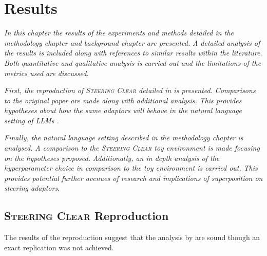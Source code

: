 \chapter{Results}
\label{ch:results}

\emph{In this chapter the results of the experiments and methods detailed in the methodology chapter  and background chapter  are presented.}
\emph{A detailed analysis of the results is included along with references to similar results within the literature.}
\emph{Both quantitative and qualitative analysis is carried out and the limitations of the metrics used are discussed.}

\emph{First, the reproduction of {\scshape Steering Clear} \citep{steering-clear} detailed in  is presented.}
\emph{Comparisons to the original paper are made along with additional analysis.}
\emph{This provides hypotheses about how the same adaptors will behave in the natural language setting of LLMs .}

\emph{Finally, the natural language setting described in the methodology chapter  is analysed.}
\emph{A comparison to the {\scshape Steering Clear} toy environment is made focusing on the hypotheses proposed.}
\emph{Additionally, an in depth analysis of the hyperparameter choice in comparison to the toy environment is carried out.}
\emph{This provides potential further avenues of research and implications of superposition  on steering adaptors.}

\section{{\scshape Steering Clear} Reproduction}
\label{sec:steering-clear-res}

The results of the reproduction suggest that the analysis by \citet{steering-clear} are sound though an exact replication was not achieved.

